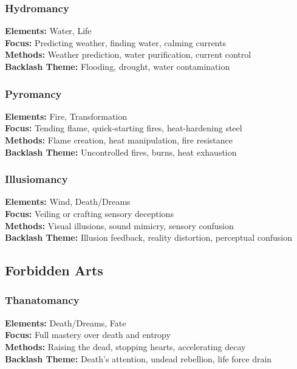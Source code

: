 \subsubsection{Hydromancy}
\textbf{Elements:} Water, Life\\
\textbf{Focus:} Predicting weather, finding water, calming currents\\
\textbf{Methods:} Weather prediction, water purification, current control\\
\textbf{Backlash Theme:} Flooding, drought, water contamination

\subsubsection{Pyromancy}
\textbf{Elements:} Fire, Transformation\\
\textbf{Focus:} Tending flame, quick-starting fires, heat-hardening steel\\
\textbf{Methods:} Flame creation, heat manipulation, fire resistance\\
\textbf{Backlash Theme:} Uncontrolled fires, burns, heat exhaustion

\subsubsection{Illusiomancy}
\textbf{Elements:} Wind, Death/Dreams\\
\textbf{Focus:} Veiling or crafting sensory deceptions\\
\textbf{Methods:} Visual illusions, sound mimicry, sensory confusion\\
\textbf{Backlash Theme:} Illusion feedback, reality distortion, perceptual confusion

\subsection{Forbidden Arts}

\subsubsection{Thanatomancy}
\textbf{Elements:} Death/Dreams, Fate\\
\textbf{Focus:} Full mastery over death and entropy\\
\textbf{Methods:} Raising the dead, stopping hearts, accelerating decay\\
\textbf{Backlash Theme:} Death's attention, undead rebellion, life force drain

